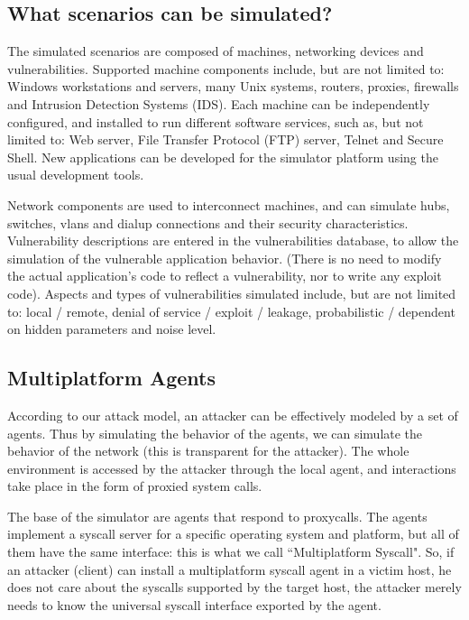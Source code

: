 \documentclass{llncs}
\begin{document}
\subsection{What scenarios can be simulated?}
The simulated scenarios are composed of machines, networking devices and vulnerabilities.
Supported machine components include, but are not limited to: Windows workstations and servers, many Unix
systems, routers, proxies, firewalls and Intrusion Detection Systems (IDS).
Each machine can be independently configured, and installed to run different software
services, such as, but not limited to:
Web server, File Transfer Protocol (FTP) server, Telnet and Secure Shell. 
New applications can be
developed for the simulator platform using the usual development tools.

Network components are used to interconnect machines, and can simulate hubs,
switches, vlans and dialup connections and their security characteristics.
Vulnerability descriptions are entered in the vulnerabilities database, to allow the
simulation of the vulnerable application behavior. (There is no need to modify the actual
application's code to reflect a vulnerability, nor to write any exploit code). Aspects and
types of vulnerabilities simulated include, but are not limited to: local / remote, denial of service / exploit /
leakage, probabilistic / dependent on hidden parameters and noise level.

\subsection{Multiplatform Agents}

According to our attack model, an attacker can be effectively modeled by a set of agents.
Thus by simulating the behavior of the agents,
we can simulate the behavior of the network (this is transparent for the attacker).
The whole environment is accessed by the attacker through the local agent, 
and interactions take place in the form of proxied system calls.

The base of the simulator are agents that respond to proxycalls.
The agents implement a syscall server for a specific operating system and platform, 
but all of them have the same interface: this is what we call ``Multiplatform Syscall". 
So, if an attacker (client) can install a multiplatform syscall agent in a victim host, 
he does not care about the syscalls supported by the target host, 
the attacker merely needs to know the universal syscall interface exported by the agent.
\end{document}
